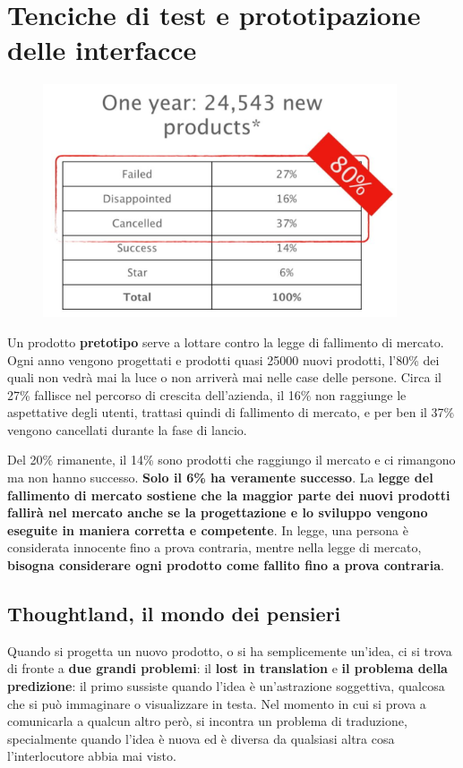 \chapter{Tenciche di test e prototipazione delle interfacce}
\begin{figure}[!h]
	\centering
	\includegraphics[scale=0.5]{immagini/Fall_mercato.png}
\end{figure}


Un prodotto \textbf{pretotipo} serve a lottare contro la legge di fallimento di mercato. Ogni anno vengono progettati e prodotti quasi 25000 nuovi prodotti, l'80\% dei quali non vedrà mai la luce o non arriverà mai nelle case delle persone. Circa il 27\% fallisce nel percorso di crescita dell'azienda, il 16\% non raggiunge le aspettative degli utenti, trattasi quindi di fallimento di mercato, e per ben il 37\% vengono cancellati durante la fase di lancio.

Del 20\% rimanente, il 14\% sono prodotti che raggiungo il mercato e ci rimangono ma non hanno successo. \textbf{Solo il 6\% ha veramente successo}. La \textbf{legge del fallimento di mercato sostiene che la maggior parte dei nuovi prodotti fallirà nel mercato anche se la progettazione e lo sviluppo vengono eseguite in maniera corretta e competente}.
In legge, una persona è considerata innocente fino a prova contraria, mentre nella legge di mercato, \textbf{bisogna considerare ogni prodotto come fallito fino a prova contraria}.

\section{Thoughtland, il mondo dei pensieri}
Quando si progetta un nuovo prodotto, o si ha semplicemente un'idea, ci si trova di fronte a \textbf{due grandi problemi}: il \textbf{lost in translation} e \textbf{il problema della predizione}: il primo sussiste quando l'idea è un'astrazione soggettiva, qualcosa che si può immaginare o visualizzare in testa. Nel momento in cui si prova a comunicarla a qualcun altro però, si incontra un problema di traduzione, specialmente quando l'idea è nuova ed è diversa da qualsiasi altra cosa l'interlocutore abbia mai visto.

